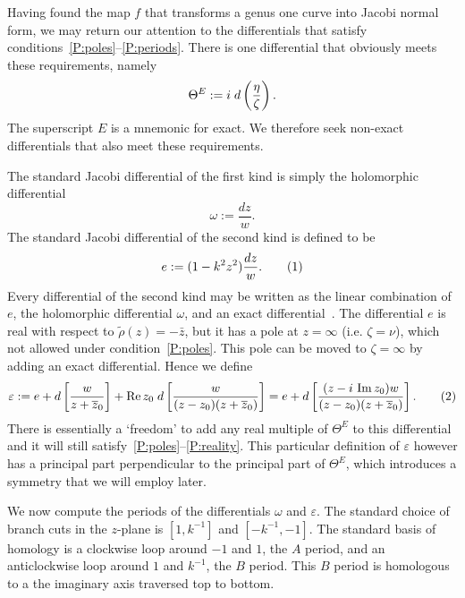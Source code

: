 \documentclass{article}
\begin{document}
Having found the map $f$ that transforms a genus one curve into Jacobi normal form, we may return our attention to the differentials that satisfy conditions~\ref{P:poles}--\ref{P:periods}.
There is one differential that obviously meets these requirements, namely
\[
\Theta^E := i\; d\left( \frac{\eta}{\zeta} \right).
\]
The superscript $E$ is a mnemonic for exact. We therefore seek non-exact differentials that also meet these requirements.

The standard Jacobi differential of the first kind is simply the holomorphic differential
\[
\omega := \frac{dz}{w}.
\]
The standard Jacobi differential of the second kind is defined to be
\[
e := (1-k^2 z^2) \frac{dz}{w}.
\labelthis{eqn:def_e}
\]
Every differential of the second kind may be written as the linear combination of $e$, the holomorphic differential $\omega$, and an exact differential~\cite[Art. 167]{Hancock1910}.
The differential $e$ is real with respect to $\tilde{\rho}(z) = -\bar{z}$, but it has a pole at $z=\infty$ (i.e. $\zeta=\nu$), which not allowed under condition~\ref{P:poles}. This pole can be moved to $\zeta=\infty$ by adding an exact differential. Hence we define 
\[
\varepsilon := e + d\left[ \frac{w}{z + \bar{z}_0} \right] + \Real z_0\; d\left[ \frac{w}{(z-z_0)(z + \bar{z}_0)} \right]
= e + d\left[ \frac{(z - \iu\,\Imag z_0)w}{(z-z_0)(z + \bar{z}_0)} \right].
\labelthis{eqn:def_varepsilon}
\]
There is essentially a `freedom' to add any real multiple of $\Theta^E$ to this differential and it will still satisfy~\ref{P:poles}--\ref{P:reality}. This particular definition of $\varepsilon$ however has a principal part perpendicular to the principal part of $\Theta^E$, which introduces a symmetry that we will employ later.

We now compute the periods of the differentials $\omega$ and $\varepsilon$. 
The standard choice of branch cuts in the $z$-plane is $[1,k^{-1}]$ and $[-k^{-1},-1]$. The standard basis of homology is a clockwise loop around $-1$ and $1$, the $A$ period, and an anticlockwise loop around $1$ and $k^{-1}$, the $B$ period. This $B$ period is homologous to a the imaginary axis traversed top to bottom. 
\end{document}
